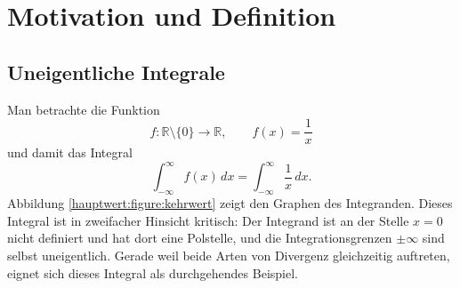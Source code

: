 %
%
%
%
\section{Motivation und Definition
\label{hauptwert:section:motivation-definition}}
\subsection{Uneigentliche Integrale}


Man betrachte die Funktion
\begin{equation}
f\colon \mathbb{R}\setminus\{0\} \to \mathbb{R},
\qquad
f(x) = \frac{1}{x}
\end{equation}
und damit das Integral
\begin{equation}
\int_{-\infty}^{\infty} f(x)\,dx
= \int_{-\infty}^{\infty} \frac{1}{x}\,dx.
\end{equation}
Abbildung \ref{hauptwert:figure:kehrwert} zeigt den Graphen des Integranden.
Dieses Integral ist in zweifacher Hinsicht kritisch:
Der Integrand ist an der Stelle $x = 0$ nicht definiert
und hat dort eine Polstelle,
%
und die Integrationsgrenzen $\pm\infty$ sind selbst uneigentlich.
%
Gerade weil beide Arten von Divergenz gleichzeitig auftreten,
%
eignet sich dieses Integral als durchgehendes Beispiel.

